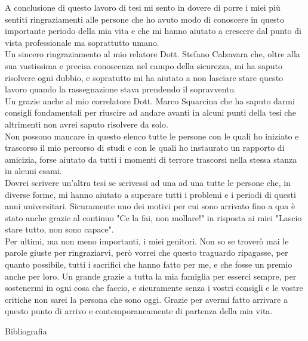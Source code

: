 \documentclass[11pt ,a4paper , twoside , openright ]{book}
\begin{document}
	\begin{flushleft}
		A conclusione di questo lavoro di tesi mi sento in dovere di porre i miei più sentiti ringraziamenti alle persone che ho avuto modo di conoscere in questo importante periodo della mia vita e che mi hanno aiutato a crescere dal punto di vista professionale ma soprattutto umano.
		\\
		Un sincero ringraziamento al mio relatore Dott. Stefano Calzavara che, oltre alla sua vastissima e precisa conoscenza nel campo della sicurezza, mi ha saputo risolvere ogni dubbio, e sopratutto mi ha aiutato a non lasciare stare questo lavoro quando la rassegnazione stava prendendo il sopravvento.
		\\
		Un grazie anche al mio correlatore Dott. Marco Squarcina che ha saputo darmi consigli fondamentali per riuscire ad andare avanti in alcuni punti della tesi che altrimenti non avrei saputo risolvere da solo.
		\\
		Non possono mancare in questo elenco tutte le persone con le quali ho iniziato e trascorso il mio percorso di studi e con le quali ho instaurato un rapporto di amicizia, forse aiutato da tutti i momenti di terrore trascorsi nella stessa stanza in alcuni esami.
		\\
		Dovrei scrivere un'altra tesi se scrivessi ad una ad una tutte le persone che, in diverse forme, mi hanno aiutato a superare tutti i problemi e i periodi di questi anni universitari. Sicuramente uno dei motivi per cui sono arrivato fino a qua è stato anche grazie al continuo "Ce la fai, non mollare!" in risposta ai miei "Lascio stare tutto, non sono capace". 
		\\
		Per ultimi, ma non meno importanti, i miei genitori.
		Non so se troverò mai le parole giuste per ringraziarvi, però vorrei che questo traguardo ripagasse, per quanto possibile, tutti i sacrifici che hanno fatto per me, e che fosse un premio anche per loro.
		Un grande grazie a tutta la mia famiglia per esserci sempre, per sostenermi in ogni cosa che faccio, e sicuramente senza i vostri consigli e le vostre critiche non sarei la persona che sono oggi.
		Grazie per avermi fatto arrivare a questo punto di arrivo e contemporaneamente di partenza della mia vita.
	\end{flushleft}
\cleardoublepage
\listoffigures
\cleardoublepage
\begin{flushright}
	Bibliografia
\end{flushright}
\end{document}
